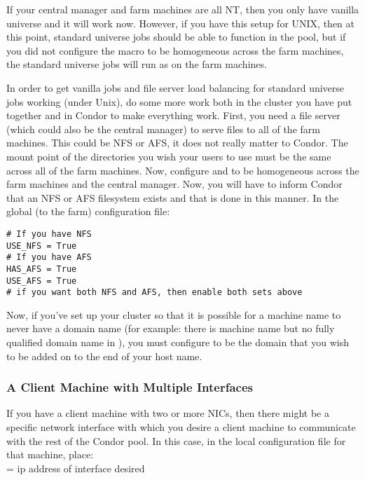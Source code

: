If your central manager and farm machines are all NT, then you only have
vanilla universe and it will work now.  However, if you have this setup
for UNIX, then at this point, standard universe jobs should be able to
function in the pool, but if you did not configure the 
macro to be homogeneous across the farm machines, the standard universe
jobs will run as  on the farm machines.

In order to get vanilla jobs and file server load balancing for standard
universe jobs working (under Unix), do some more work both in
the cluster you have put together and in Condor to make everything work.
First, you need a file server (which could also be the central manager) to
serve files to all of the farm machines. This could be NFS or AFS, it does
not really matter to Condor. The mount point of the directories you wish
your users to use must be the same across all of the farm machines. Now,
configure  and  to be
homogeneous across the farm machines and the central manager. Now, you
will have to inform Condor that an NFS or AFS filesystem exists and that
is done in this manner. In the global (to the farm) configuration file:

\begin{verbatim}
# If you have NFS
USE_NFS = True
# If you have AFS
HAS_AFS = True
USE_AFS = True
# if you want both NFS and AFS, then enable both sets above
\end{verbatim}

Now, if you've set up your cluster so that it is possible for a machine
name to never have a domain name (for example: there is machine
name but no fully qualified domain name in ), you must
configure  to be the domain that you wish
to be added on to the end of your host name.


\subsubsection{A Client Machine with Multiple Interfaces}

If you have a client machine with two or more NICs, then there might be
a specific network interface with which you desire a client machine to
communicate with the rest of the Condor pool. In this case, in the local
configuration file for that machine, place: \\ 
 = ip address of interface desired \\


